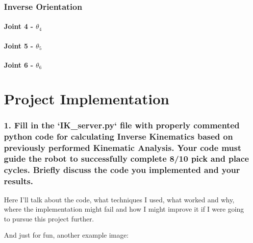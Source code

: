 \documentclass{article}
\begin{document}
\subsubsection{Inverse Orientation}

\paragraph{Joint 4 - $\theta _4$}

\paragraph{Joint 5 - $\theta _5$}

\paragraph{Joint 6 - $\theta _6$}

\section{Project Implementation}

\subsubsection{1. Fill in the `IK\_server.py` file with properly commented python code for calculating Inverse Kinematics based on previously performed Kinematic Analysis. Your code must guide the robot to successfully complete 8/10 pick and place cycles. Briefly discuss the code you implemented and your results.}


Here I'll talk about the code, what techniques I used, what worked and why, where the implementation might fail and how I might improve it if I were going to pursue this project further.  


And just for fun, another example image:
\end{document}
